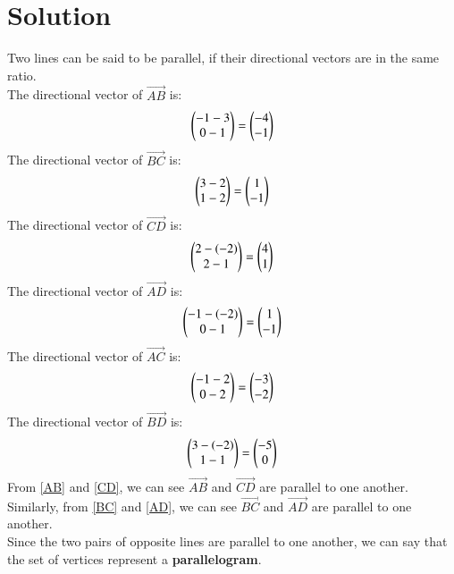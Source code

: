 \documentclass[journal,12pt,twocolumn]{IEEEtran}
\begin{document}
\section{Solution}
Two lines can be said to be parallel, if their directional vectors are in the same ratio.\\
The directional vector of $\vec{AB}$ is:
\begin{align}
    \begin{pmatrix}-1-3\\0-1\end{pmatrix} = \begin{pmatrix}-4\\-1\end{pmatrix}
    \label{AB}
\end{align}
The directional vector of $\vec{BC}$ is:
\begin{align}
    \begin{pmatrix}3-2\\1-2\end{pmatrix} = \begin{pmatrix}1\\-1\end{pmatrix}
    \label{BC}
\end{align}
The directional vector of $\vec{CD}$ is:
\begin{align}
    \begin{pmatrix}2-(-2)\\2-1\end{pmatrix} = \begin{pmatrix}4\\1\end{pmatrix}
    \label{CD}
\end{align}
The directional vector of $\vec{AD}$ is:
\begin{align}
    \begin{pmatrix}-1-(-2)\\0-1\end{pmatrix} = \begin{pmatrix}1\\-1\end{pmatrix}
    \label{AD}
\end{align}
The directional vector of $\vec{AC}$ is:
\begin{align}
    \begin{pmatrix}-1-2\\0-2\end{pmatrix} = \begin{pmatrix}-3\\-2\end{pmatrix}
    \label{AC}
\end{align}
The directional vector of $\vec{BD}$ is:
\begin{align}
    \begin{pmatrix}3-(-2)\\1-1\end{pmatrix} = \begin{pmatrix}-5\\0\end{pmatrix}
    \label{BD}
\end{align}
From \eqref{AB} and \eqref{CD}, we can see $\vec{AB}$ and $\vec{CD}$ are parallel to one another. Similarly, from \eqref{BC} and \eqref{AD}, we can see $\vec{BC}$ and $\vec{AD}$ are parallel to one another.\\
Since the two pairs of opposite lines are parallel to one another, we can say that the set of vertices represent a \textbf{parallelogram}.\\
\end{document}

